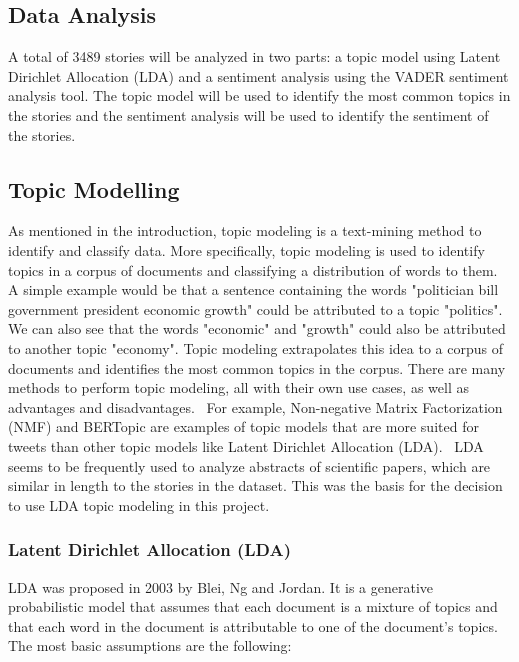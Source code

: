 \subsection{Data Analysis}

A total of 3489 stories will be analyzed in two parts: a topic model using Latent Dirichlet Allocation (LDA) and a sentiment analysis using the VADER sentiment analysis tool. The topic model will be used to identify the most common topics in the stories and the sentiment analysis will be used to identify the sentiment of the stories.

\subsection{Topic Modelling}

As mentioned in the introduction, topic modeling is a text-mining method to identify and classify data. More specifically, topic modeling is used to identify topics in a corpus of documents and classifying a distribution of words to them. A simple example would be that a sentence containing the words "politician bill government president economic growth" could be attributed to a topic "politics". We can also see that the words "economic" and "growth" could also be attributed to another topic "economy". Topic modeling extrapolates this idea to a corpus of documents and identifies the most common topics in the corpus. There are many methods to perform topic modeling, all with their own use cases, as well as advantages and disadvantages.~\cite{abdelrazek2022topic} For example, Non-negative Matrix Factorization (NMF) and BERTopic are examples of topic models that are more suited for tweets than other topic models like Latent Dirichlet Allocation (LDA).~\cite{egger2022topic} LDA seems to be frequently used to analyze abstracts of scientific papers, which are similar in length to the stories in the dataset. This was the basis for the decision to use LDA topic modeling in this project.

\subsubsection{Latent Dirichlet Allocation (LDA)}

LDA was proposed in 2003 by Blei, Ng and Jordan. It is a generative probabilistic model that assumes that each document is a mixture of topics and that each word in the document is attributable to one of the document's topics.~\cite{NIPS2001_296472c9} The most basic assumptions are the following:

